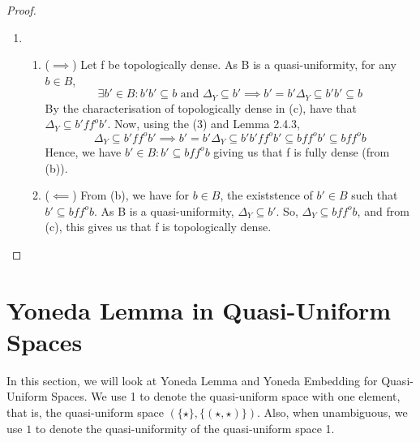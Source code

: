 \documentclass[18pt,a4paper]{article}
\theoremstyle{definition}
\begin{document}
\begin{proof}
\begin{enumerate}[label=(\alph*)]
	\item \begin{enumerate}[label=(\roman*)]
		\item
			($\implies $) Let f be topologically dense. As B is a quasi-uniformity, for any $b \in B$,
			\begin{equation}\exists b' \in B : b'b' \subseteq b \text{ and } \Delta_Y \subseteq b'
				\implies b'=b'\Delta_Y \subseteq b'b' \subseteq b
			\end{equation}
			By the characterisation of topologically dense in (c), have that $\Delta_Y \subseteq b'f f^o b'$.
			Now, using the (3) and Lemma 2.4.3,
			\[ \Delta_Y \subseteq b'f f^o b' \implies b'=b'\Delta_Y \subseteq b'b'f f^o b' \subseteq bf f^o b'
			\subseteq bf f^o b\]
			Hence, we have $b'\in B : b' \subseteq bf f^o b$ giving us that f is fully dense (from (b)).
		\item ($\impliedby$) From (b), we have for $b \in B$, the existstence of $b' \in B$ such that $
			b' \subseteq bf f^o b$. As B is a quasi-uniformity, $\Delta_Y \subseteq b'$. So,
			$\Delta_Y \subseteq bf f^o b$, and from (c), this gives us that f is topologically dense. \qedhere
	\end{enumerate}
\end{enumerate}
\end{proof}
\section{Yoneda Lemma in Quasi-Uniform Spaces}

In this section, we will look at Yoneda Lemma and Yoneda Embedding for Quasi-Uniform Spaces.
We use 1 to denote the quasi-uniform space with one element, that is, the quasi-uniform space
$(\{\star\},\{(\star,\star)\})$. Also, when unambiguous, we use $1$ to denote the quasi-uniformity
of the quasi-uniform space 1.
\end{document}
